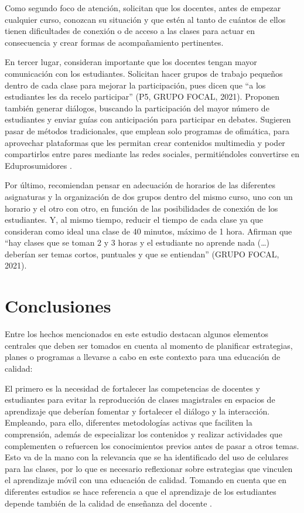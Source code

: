 \documentclass{textolivre}
\begin{document}
Como segundo foco de atención, solicitan que los docentes, antes de empezar cualquier curso, conozcan su situación y que estén al tanto de cuántos de ellos tienen dificultades de conexión o de acceso a las clases para actuar en consecuencia y crear formas de acompañamiento pertinentes.

En tercer lugar, consideran importante que los docentes tengan mayor comunicación con los estudiantes. Solicitan hacer grupos de trabajo pequeños dentro de cada clase para mejorar la participación, pues dicen que “a los estudiantes les da recelo participar” (P5, GRUPO FOCAL, 2021). Proponen también generar diálogos, buscando la participación del mayor número de estudiantes y enviar guías con anticipación para participar en debates. Sugieren pasar de métodos tradicionales, que emplean solo programas de ofimática, para aprovechar plataformas que les permitan crear contenidos multimedia y poder compartirlos entre pares mediante las redes sociales, permitiéndoles convertirse en Eduprosumidores \cite{basantes-andrade_eduprosumers:_2020b}.

Por último, recomiendan pensar en adecuación de horarios de las diferentes asignaturas y la organización de dos grupos dentro del mismo curso, uno con un horario y el otro con otro, en función de las posibilidades de conexión de los estudiantes. Y, al mismo tiempo, reducir el tiempo de cada clase ya que consideran como ideal una clase de 40 minutos, máximo de 1 hora. Afirman que “hay clases que se toman 2 y 3 horas y el estudiante no aprende nada (…) deberían ser temas cortos, puntuales y que se entiendan” (GRUPO FOCAL, 2021).

\section{Conclusiones}\label{sec-organizacao}
Entre los hechos mencionados en este estudio destacan algunos elementos centrales que deben ser tomados en cuenta al momento de planificar estrategias, planes o programas a llevarse a cabo en este contexto para una educación de calidad:

El primero es la necesidad de fortalecer las competencias de docentes y estudiantes para evitar la reproducción de clases magistrales en espacios de aprendizaje que deberían fomentar y fortalecer el diálogo y la interacción. Empleando, para ello, diferentes metodologías activas que faciliten la comprensión, además de especializar los contenidos y realizar actividades que complementen o refuercen los conocimientos previos antes de pasar a otros temas. Esto va de la mano con la relevancia que se ha identificado del uso de celulares para las clases, por lo que es necesario reflexionar sobre estrategias que vinculen el aprendizaje móvil con una educación de calidad. Tomando en cuenta que en diferentes estudios se hace referencia a que el aprendizaje de los estudiantes depende también de la calidad de enseñanza del docente \cite{barber_como_2008}.
\end{document}
